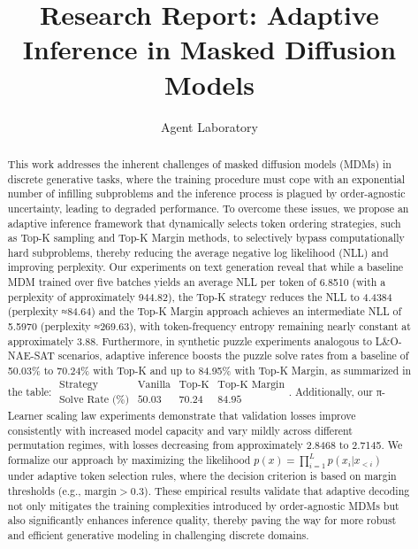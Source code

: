 \documentclass{article}
\title{Research Report: Adaptive Inference in Masked Diffusion Models}
\author{Agent Laboratory}
\date{}
\begin{document}
\maketitle

\begin{abstract}
This work addresses the inherent challenges of masked diffusion models (MDMs) in discrete generative tasks, where the training procedure must cope with an exponential number of infilling subproblems and the inference process is plagued by order-agnostic uncertainty, leading to degraded performance. To overcome these issues, we propose an adaptive inference framework that dynamically selects token ordering strategies, such as Top-K sampling and Top-K Margin methods, to selectively bypass computationally hard subproblems, thereby reducing the average negative log likelihood (NLL) and improving perplexity. Our experiments on text generation reveal that while a baseline MDM trained over five batches yields an average NLL per token of 6.8510 (with a perplexity of approximately 944.82), the Top-K strategy reduces the NLL to 4.4384 (perplexity ≈84.64) and the Top-K Margin approach achieves an intermediate NLL of 5.5970 (perplexity ≈269.63), with token-frequency entropy remaining nearly constant at approximately 3.88. Furthermore, in synthetic puzzle experiments analogous to L\&O-NAE-SAT scenarios, adaptive inference boosts the puzzle solve rates from a baseline of 50.03\% to 70.24\% with Top-K and up to 84.95\% with Top-K Margin, as summarized in the table: $\begin{array}{c|ccc} \text{Strategy} & \text{Vanilla} & \text{Top-K} & \text{Top-K Margin} \\ \hline \text{Solve Rate (\%)} & 50.03 & 70.24 & 84.95 \end{array}$. Additionally, our π-Learner scaling law experiments demonstrate that validation losses improve consistently with increased model capacity and vary mildly across different permutation regimes, with losses decreasing from approximately 2.8468 to 2.7145. We formalize our approach by maximizing the likelihood $p(x)=\prod_{i=1}^{L}p(x_i|x_{<i})$ under adaptive token selection rules, where the decision criterion is based on margin thresholds (e.g., $\text{margin} > 0.3$). These empirical results validate that adaptive decoding not only mitigates the training complexities introduced by order-agnostic MDMs but also significantly enhances inference quality, thereby paving the way for more robust and efficient generative modeling in challenging discrete domains.
\end{abstract}
\end{document}
